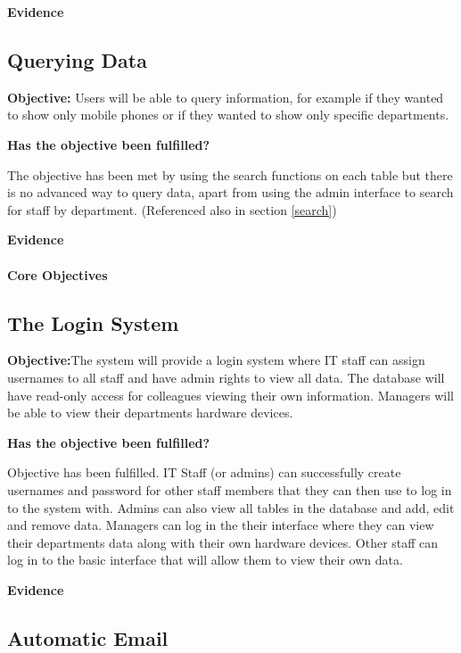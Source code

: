 \textbf{Evidence}



\subsection{Querying Data}

\textbf{Objective:} Users will be able to query information, for example if they wanted to show only mobile phones or if they wanted to show only specific departments.

\textbf{Has the objective been fulfilled?}

The objective has been met by using the search functions on each table but there is no advanced way to query data, apart from using the admin interface to search for staff by department. (Referenced also in section \ref{search})

\textbf{Evidence}



\paragraph{Core Objectives}

\subsection{The Login System}

\textbf{Objective:}The system will provide a login system where IT staff can assign usernames to all staff and have admin rights to view all data. The database will have read-only access for colleagues viewing their own information. Managers will be able to view their departments hardware devices.

\textbf{Has the objective been fulfilled?}

Objective has been fulfilled. IT Staff (or admins) can successfully create usernames and password for other staff members that they can then use to log in to the system with. Admins can also view all tables in the database and add, edit and remove data. Managers can log in the their interface where they can view their departments data along with their own hardware devices. Other staff can log in to the basic interface that will allow them to view their own data.

\textbf{Evidence}



\subsection{Automatic Email}

